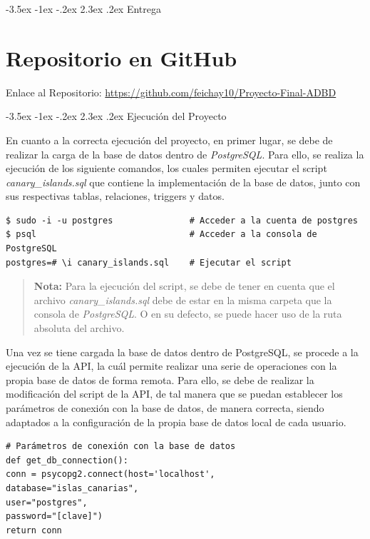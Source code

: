 \documentclass[11pt]{report}
\makeatletter
\renewcommand\chapter{\@startsection{chapter}{0}{\z@}%
    {-3.5ex \@plus -1ex \@minus -.2ex}%
    {2.3ex \@plus.2ex}%
    {\normalfont\Large\bfseries}}
\makeatother
\begin{document}
\chapter{Entrega}

\section{Repositorio en GitHub}
Enlace al Repositorio: \url{https://github.com/feichay10/Proyecto-Final-ADBD}

\chapter{Ejecución del Proyecto}

En cuanto a la correcta ejecución del proyecto, en primer lugar, se debe de realizar la carga de la base de datos dentro de \emph{PostgreSQL}. Para ello, se realiza la ejecución de los siguiente comandos, los cuales permiten ejecutar el script \emph{canary\_islands.sql} que contiene la implementación de la base de datos, junto con sus respectivas tablas, relaciones, triggers y datos.

\begin{verbatim}
$ sudo -i -u postgres               # Acceder a la cuenta de postgres
$ psql                              # Acceder a la consola de PostgreSQL
postgres=# \i canary_islands.sql    # Ejecutar el script
\end{verbatim}

\begin{quote}
      \textbf{Nota:} Para la ejecución del script, se debe de tener en cuenta que el archivo \emph{canary\_islands.sql} debe de estar en la misma carpeta que la consola de \emph{PostgreSQL}. O en su defecto, se puede hacer uso de la ruta absoluta del archivo.
\end{quote}

Una vez se tiene cargada la base de datos dentro de PostgreSQL, se procede a la ejecución de la API, la cuál permite realizar una serie de operaciones con la propia base de datos de forma remota. Para ello, se debe de realizar la modificación del script de la API, de tal manera que se puedan establecer los parámetros de conexión con la base de datos, de manera correcta, siendo adaptados a la configuración de la propia base de datos local de cada usuario.

\begin{verbatim}
# Parámetros de conexión con la base de datos
def get_db_connection():
conn = psycopg2.connect(host='localhost',
database="islas_canarias",
user="postgres",
password="[clave]")
return conn
\end{verbatim}
\end{document}
